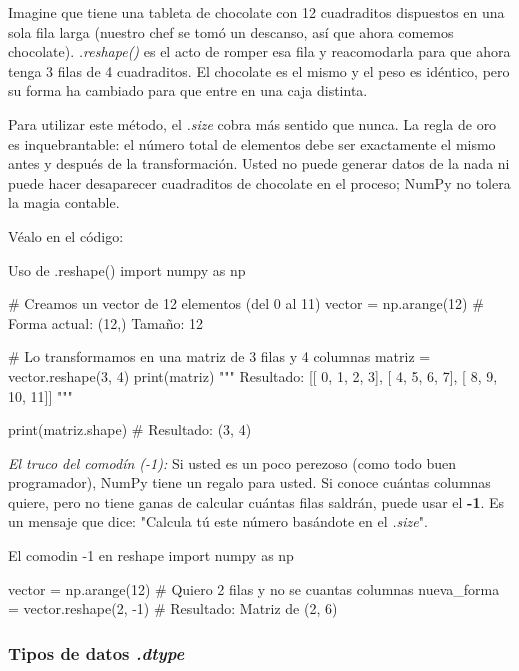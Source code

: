 \begin{ejemplo}
    Imagine que tiene una tableta de chocolate con 12 cuadraditos dispuestos en una sola fila larga (nuestro chef se tomó un descanso, así que ahora comemos chocolate). \textit{.reshape()} es el acto de romper esa fila y reacomodarla para que ahora tenga 3 filas de 4 cuadraditos. El chocolate es el mismo y el peso es idéntico, pero su forma ha cambiado para que entre en una caja distinta.
\end{ejemplo}

Para utilizar este método, el \textit{.size} cobra más sentido que nunca. La regla de oro es inquebrantable: el número total de elementos debe ser exactamente el mismo antes y después de la transformación. Usted no puede generar datos de la nada ni puede hacer desaparecer cuadraditos de chocolate en el proceso; NumPy no tolera la magia contable.

Véalo en el código:

\begin{pycode}{Uso de .reshape()}
import numpy as np

# Creamos un vector de 12 elementos (del 0 al 11)
vector = np.arange(12) # Forma actual: (12,) Tamaño: 12

# Lo transformamos en una matriz de 3 filas y 4 columnas 
matriz = vector.reshape(3, 4)
print(matriz)
"""
Resultado:
[[ 0,  1,  2,  3],
[ 4,  5,  6,  7],
[ 8,  9, 10, 11]]
"""

print(matriz.shape) # Resultado: (3, 4)
\end{pycode}

\begin{nota}
\textit{El truco del comodín (-1):} Si usted es un poco perezoso (como todo buen programador), NumPy tiene un regalo para usted. Si conoce cuántas columnas quiere, pero no tiene ganas de calcular cuántas filas saldrán, puede usar el \textbf{-1}. Es un mensaje que dice: "Calcula tú este número basándote en el \textit{.size}".
\end{nota}

\begin{pycode}{El comodin -1 en reshape}
import numpy as np 

vector = np.arange(12)
# Quiero 2 filas y no se cuantas columnas
nueva_forma = vector.reshape(2, -1) # Resultado: Matriz de (2, 6)

\end{pycode}


\subsubsection{Tipos de datos \textit{.dtype}}

